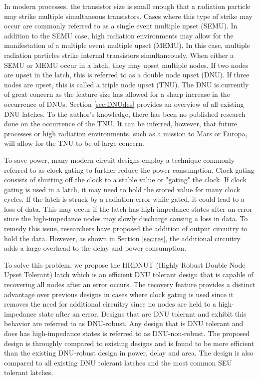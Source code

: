 In modern processes, the transistor size is small enough that a radiation particle may strike multiple simultaneous transistors. Cases where this type of strike may occur are commonly referred to as a single event multiple upset (SEMU). In addition to the SEMU case, high radiation environments may allow for the manifestation of a multiple event multiple upset (MEMU). In this case, multiple radiation particles strike internal transistors simultaneously. When either a SEMU or MEMU occur in a latch, they may upset multiple nodes. If two nodes are upset in the latch, this is referred to as a double node upset (DNU). If three nodes are upset, this is called a triple node upset (TNU). The DNU is currently of great concern as the feature size has allowed for a sharp increase in the occurrence of DNUs. Section \ref{sec:DNUdes} provides an overview of all existing DNU latches.  To the author's knowledge, there has been no published research done on the occurrence of the TNU. It can be inferred, however, that future processes or high radiation environments, such as a mission to Mars or Europa, will allow for the TNU to be of large concern.     

To save power, many modern circuit designs employ a technique commonly referred to as clock gating to further reduce the power consumption. Clock gating consists of shutting off the clock to a stable value or "gating" the clock. If clock gating is used in a latch, it may need to hold the stored value for many clock cycles. If the latch is struck by a radiation error while gated, it could lead to a loss of data. This may occur if the latch has high-impedance states after an error since the high-impedance nodes may slowly discharge causing a loss in data. To remedy this issue, researchers have proposed the addition of output circuitry to hold the data. However, as shown in Section \ref{sec:res}, the additional circuitry adds a large overhead to the delay and power consumption.

To solve this problem, we propose the HRDNUT (Highly Robust Double Node Upset Tolerant) latch which is an efficient DNU tolerant design that is capable of recovering all nodes after an error occurs. The recovery feature provides a distinct advantage over previous designs in cases where clock gating is used since it removes the need for additional circuitry since no nodes are held to a high-impedance state after an error. Designs that are DNU tolerant and exhibit this behavior are referred to as DNU-robust. Any design that is DNU tolerant and does has high-impedance states is referred to as DNU-non-robust. The proposed design is throughly compared to existing designs and is found to be more efficient than the existing DNU-robust design \cite{DONUT} in power, delay and area. The design is also compared to all existing DNU tolerant latches and the most common SEU tolerant latches.

